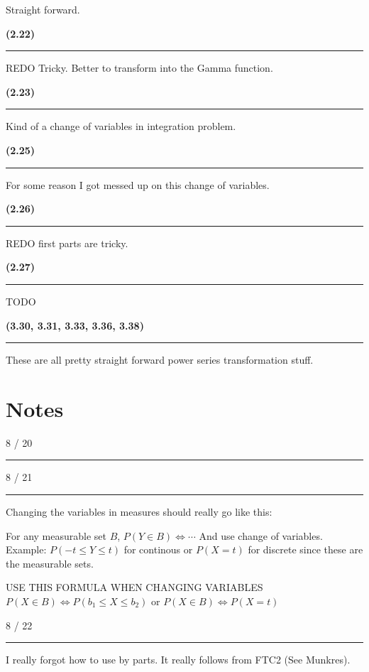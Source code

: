 \documentclass[12pt, reqno]{amsart}
\numberwithin{equation}{section}
\begin{document}
Straight forward.

{\bf (2.22)\rule{\textwidth}{.5pt}}

REDO Tricky. Better to transform into the Gamma function.

{\bf (2.23)\rule{\textwidth}{.5pt}}

Kind of a change of variables in integration problem.

{\bf (2.25)\rule{\textwidth}{.5pt}}

For some reason I got messed up on this change of variables.

{\bf (2.26)\rule{\textwidth}{.5pt}}

REDO first parts are tricky.

{\bf (2.27)\rule{\textwidth}{.5pt}}

TODO

{\bf (3.30, 3.31, 3.33, 3.36, 3.38) \rule{\textwidth}{.5pt}}

These are all pretty straight forward power series transformation stuff.

\section*{Notes}

8 / 20
\rule{\textwidth}{.5pt}

8 / 21
\rule{\textwidth}{.5pt}

Changing the variables in measures should really go like this:

For any measurable set $B$,
$P(Y \in B) \iff \cdots$
And use change of variables.
Example:
$P(-t \le Y \le t)$ for continous
or $P(X = t)$ for discrete since these are the measurable sets.

USE THIS FORMULA WHEN CHANGING VARIABLES
$P(X \in B) \iff P(b_1 \le X \le b_2)$ or $P(X \in B) \iff P(X = t)$


8 / 22
\rule{\textwidth}{.5pt}

I really forgot how to use by parts.
It really follows from FTC2 (See Munkres).
\end{document}
